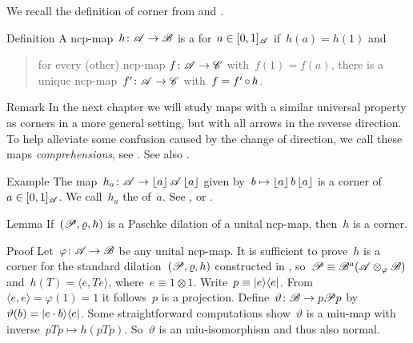 \documentclass[b]{subfiles}
\begin{document}
\begin{parsec}%
\begin{point}%
We recall the definition of corner
        from \cite[Dfn.~2]{westerbaan2016universal} and .
\end{point}
\begin{point}{Definition}%
A ncp-map~$h \colon \mathscr{A} \to \mathscr{B}$
is a  for~$a \in [0,1]_{\mathscr{A}}$ if~$h(a)=h(1)$
    and
    \begin{quote}
        for every (other) ncp-map $f\colon \mathscr{A} \to \mathscr{C}$
            with~$f(1)=f(a)$,
            there is a unique ncp-map~$f'\colon \mathscr{A} \to \mathscr{C}$
            with~$f = f' \mathop{\circ} h$.
    \end{quote}
\begin{point}{Remark}%
In the next chapter we will study maps with a similar universal property
    as corners in a more general setting,
    but with all arrows in the reverse direction.
To help alleviate some confusion caused by the change of direction,
    we call these maps \emph{comprehensions},
    see .  See also .
\end{point}
\end{point}
\begin{point}{Example}%
    The map~$h_a \colon \mathscr{A} \to \left\lfloor a\right\rfloor \mathscr{A} \left\lfloor a\right\rfloor$ given
    by~$b \mapsto \left\lfloor a\right\rfloor b \left\lfloor a\right\rfloor$
    is a corner of~$a \in [0,1]_{\mathscr{A}}$.
We call~$h_a$ the  of~$a$.
    See , 
        or \cite[Prop.~5]{westerbaan2016universal}.
\end{point}
\begin{point}{Lemma}%
If~$(\mathscr{P}, \varrho, h)$ is a Paschke dilation of a unital ncp-map,
    then~$h$ is a corner.
\begin{point}{Proof}%
Let~$\varphi \colon \mathscr{A} \to \mathscr{B}$ be any unital ncp-map.
It is sufficient to prove~$h$
    is a corner for the
    standard dilation~$(\mathscr{P} , \varrho, h)$
    constructed in ,
    so~$\mathscr{P} \equiv \mathscr{B}^a(\mathscr{A} \otimes_\varphi \mathscr{B})$
    and~$h(T) = \langle e, T e\rangle$, where~$e \equiv 1\otimes 1$.
    Write~$p \equiv \left|e\right>\!\left<e\right|$.
From~$\langle e,e\rangle = \varphi(1) = 1$
    it follows~$p$ is a projection.
Define~$\vartheta\colon \mathscr{B} \to p \mathscr{P} p$
    by~$\vartheta(b) = \left|e \cdot b\right>\!\left<e\right|$.
Some straightforward computations
    show~$\vartheta$ is a miu-map
    with inverse~$pTp \mapsto h(pTp)$.
So~$\vartheta$ is an miu-isomorphism and thus also normal.

\end{point}
\end{point}
\end{parsec}
\end{document}
